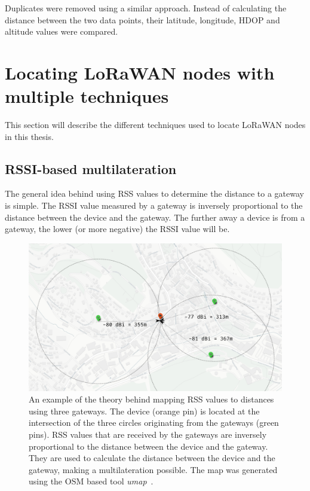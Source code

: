 Duplicates were removed using a similar approach.
Instead of calculating the distance between the two data points, their latitude, longitude, \ac{HDOP} and altitude values were compared.

\section{Locating \acs{LoRaWAN} nodes with multiple techniques}

This section will describe the different techniques used to locate \ac{LoRaWAN} nodes in this thesis.

\subsection{\acs{RSSI}-based multilateration}\label{sec:rssi-based-multilateration-implementation}

The general idea behind using \ac{RSS} values to determine the distance to a gateway is simple.
The \ac{RSSI} value measured by a gateway is inversely proportional to the distance between the device and the gateway.
The further away a device is from a gateway, the lower (or more negative) the \ac{RSSI} value will be.

\begin{figure}[htbp]
    \centering
    \includegraphics[width=1\textwidth]{pictures/multilateration/rssi-multilateration-example.png}
    \caption{
        An example of the theory behind mapping \ac{RSS} values to distances using three gateways.
        The device (orange pin) is located at the intersection of the three circles originating from the gateways (green pins).
        \ac{RSS} values that are received by the gateways are inversely proportional to the distance between the device and the gateway.
        They are used to calculate the distance between the device and the gateway, making a multilateration possible.
        The map was generated using the \ac{OSM} based tool \emph{umap}~\cite{noauthor_umap_nodate}.
    }\label{fig:rssi-multilateration-theoretical-example}
\end{figure}

